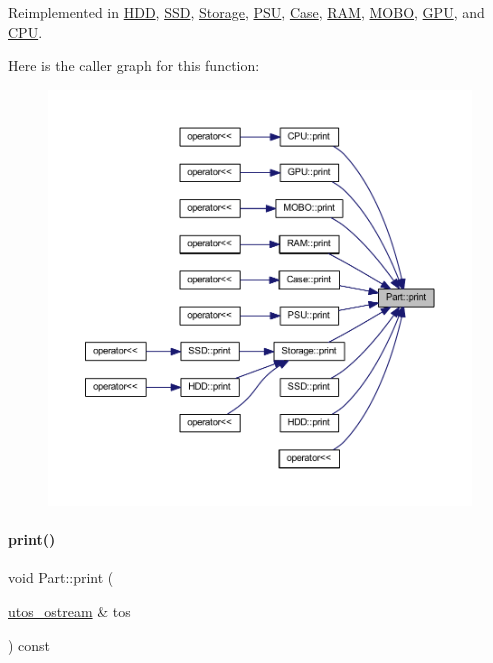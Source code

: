 Reimplemented in \mbox{\hyperlink{class_h_d_d_a07c34356018542934a4dd91ce38b0821}{H\+DD}}, \mbox{\hyperlink{class_s_s_d_a3c07aa0fd7bb547cfb4a775513e427a9}{S\+SD}}, \mbox{\hyperlink{class_storage_aa9f6ffb0fd45839b54bd4e254270445d}{Storage}}, \mbox{\hyperlink{class_p_s_u_ad8f95676e09f5ba805dbba50759f44ba}{P\+SU}}, \mbox{\hyperlink{class_case_a9e54f42dcb7b62f1792a6475ce60aa79}{Case}}, \mbox{\hyperlink{class_r_a_m_a2f226659cbc23f841d73525572ba9574}{R\+AM}}, \mbox{\hyperlink{class_m_o_b_o_a3241f425030e01d5b7a192c23af2dbda}{M\+O\+BO}}, \mbox{\hyperlink{class_g_p_u_abfa2a8fa30047e9759080d724e4b3820}{G\+PU}}, and \mbox{\hyperlink{class_c_p_u_ad4d3ebb288deeaad640e034bdb71a40a}{C\+PU}}.

Here is the caller graph for this function\+:
\nopagebreak
\begin{figure}[H]
\begin{center}
\leavevmode
\includegraphics[width=350pt]{class_part_a4fa402b8e8fd4236ff773a7697ab2bc3_icgraph}
\end{center}
\end{figure}
\mbox{\label{class_part_a9ecabe44ba3415badf82c6a23617a41e}} 
\paragraph{\texorpdfstring{print()}{print()}\hspace{0.1cm}{\footnotesize\ttfamily [2/4]}}
{\footnotesize\ttfamily void Part\+::print (\begin{DoxyParamCaption}\item[{\mbox{\hyperlink{structutos__ostream}{utos\+\_\+ostream}} \&}]{tos }\end{DoxyParamCaption}) const\hspace{0.3cm}{\ttfamily [virtual]}}



